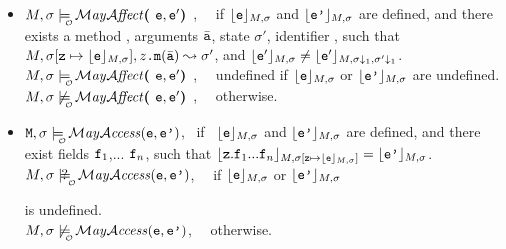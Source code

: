 \begin{definition}
\begin{itemize}
 \item
$\M,\sigma  \modelsWithO \MayAffect \lp\syntax{\sE},\syntax{\sE'}\rp$, \ \ if
{$\interp {\prg{\sE} }{\M,\sigma}$ and $\interp {\prg{\sE'} }{\M,\sigma}$ are defined,} and there exists a method , arguments $\bar{\prg{a}}$, state $\sigma'$, identifier , such that
    $ \M, \sigma[\prg{z}\mapsto \interp {\syntax{\sE}} {\M,\sigma}], \syntax{z}\prg{.m}(\bar{\prg{a}}) \leadsto   \sigma'$, and   $\interp {\syntax{\sE'}} {\M,\sigma} \neq  \interp {\syntax{{\sE'}}} {\M,\sigma\downarrow_1,\sigma'\downarrow_1}    $.\\
 $\M,\sigma  \modelsWithO \MayAffect \lp\syntax{\sE},\syntax{\sE'}\rp$, \ \ undefined if
{$\interp {\prg{\sE} }{\M,\sigma}$ or $\interp {\prg{\sE'} }{\M,\sigma}$ are undefined}.
\\
{$\M,\sigma \not\modelsWithO \MayAffect \lp\syntax{\sE},\syntax{\sE'}\rp$, \ \ otherwise.}

\item
$\Prog{},\sigma \modelsWithO { \MayAccess}(\prg{\sE},\prg{\sE'})$,   \ if \  {$\interp {\prg{\sE} }{\M,\sigma}$ and $\interp {\prg{\sE'} }{\M,\sigma}$ are defined,} and there exist  fields  $\prg{f}_1$,... $\prg{f}_n$, such that
      $\interp{\prg{z}.\prg{f}_1...\prg{f}_n}{\M,\sigma[\prg{z}\mapsto \interp {\syntax{\sE}} {\M,\sigma}]}= \interp {\prg{\sE'} }{\M,\sigma}$.
\\
 $\M,\sigma  \modelsWithOQ  {\MayAccess}(\prg{\sE},\prg{\sE'})$, \ \  if
 $\interp {\prg{\sE} }{\M,\sigma}$  or $\interp {\prg{\sE'} }{\M,\sigma}$ \\
\strut \hspace{1in} is undefined.
\\
{$\M,\sigma \not\modelsWithO  {\MayAccess}(\prg{\sE},\prg{\sE'})$, \ \ otherwise.}


\end{itemize}
\end{definition}
